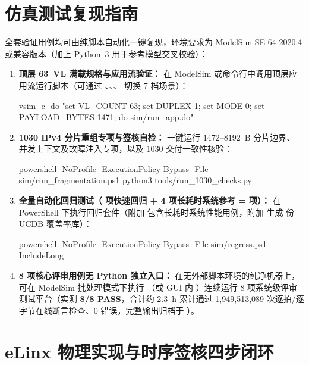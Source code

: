 \section{仿真测试复现指南}\label{sec:simrepro}

全套验证用例均可由纯脚本自动化一键复现，环境要求为 ModelSim SE-64 2020.4 或兼容版本（加上 Python~3 用于参考模型交叉校验）：

\begin{enumerate}[leftmargin=2em,itemsep=2pt]
  \item \textbf{顶层  63~VL 满载规格与应用流验证：}
    在 ModelSim 或命令行中调用顶层应用流运行脚本（可通过 、、、 切换 7 档场景）：
\begin{runcommand}
vsim -c -do "set VL_COUNT 63; set DUPLEX 1; set MODE 0; set PAYLOAD_BYTES 1471; do sim/run_app.do"
\end{runcommand}
  \item \textbf{1030 IPv4 分片重组专项与签核自检：}
    一键运行 $1472\text{--}8192$~B 分片边界、\ReasmContexts{} 并发上下文及故障注入专项，以及 1030 交付一致性核验：
\begin{runcommand}
powershell -NoProfile -ExecutionPolicy Bypass -File sim/run_fragmentation.ps1
python3 tools/run_1030_checks.py
\end{runcommand}
  \item \textbf{全量自动化回归测试（\RegFastCount{} 项快速回归 + 4 项长耗时系统参考 = \RegCount{} 项）：}
    在 PowerShell 下执行回归套件（附加  包含长耗时系统性能用例，附加  生成 \CovUcdbCount{} 份 UCDB 覆盖率库）：
\begin{runcommand}
powershell -NoProfile -ExecutionPolicy Bypass -File sim/regress.ps1 -IncludeLong
\end{runcommand}
  \item \textbf{8 项核心评审用例无 Python 独立入口：}
    在无外部脚本环境的纯净机器上，可在 ModelSim 批处理模式下执行 （或 GUI 内 ）连续运行 8 项系统级评审测试平台（实测 \textbf{8/8 PASS}，合计约 2.3~h 累计通过 1,949,513,089 次逐拍/逐字节在线断言检查、0 错误，完整输出归档于 ）。
\end{enumerate}

\section{eLinx 物理实现与时序签核四步闭环}\label{sec:elintropro}

